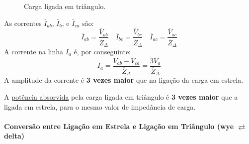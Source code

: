 \begin{centering}
\begin{minipage}[b]{0.4\linewidth}
\begin{figure}[H]
{\begin{circuitikz}[>=stealth]
        
        \end{circuitikz}
        }%
        \caption{Carga ligada em triângulo.}
        \end{figure}
\end{minipage}%
    \begin{minipage}[b]{0.6\linewidth}
        \begin{mdframed}
            \noindent As correntes $\bar{I}_{ab}$, $\bar{I}_{bc}$ e $\bar{I}_{ca}$ são:
            \vspace{0.5em}
            $$
                \bar{I}_{ab} = \dfrac{\overline{V}_{ab}}{\overline{Z}_\Delta}\quad
                \bar{I}_{bc} = \dfrac{\overline{V}_{bc}}{\overline{Z}_\Delta}\quad
                \bar{I}_{ac} = \dfrac{\overline{V}_{ac}}{\overline{Z}_\Delta}
            $$
            \vspace{0.5em}
            \noindent A corrente na linha $I_a$ é, por conseguinte:
            $$
                \boxed{\bar{I}_a = \dfrac{\overline{V}_{ab} - \overline{V}_{ca}}{\overline{Z}_\Delta} = \dfrac{3\overline{V}_a}{\overline{Z}_\Delta}}
            $$
            \noindent A amplitude da corrente é \textbf{3 vezes maior} que na ligação da carga em estrela.
        \end{mdframed}
    \end{minipage}
\end{centering}

\noindent A \underline{potência absorvida} pela carga ligada em triângulo é \textbf{3 vezes maior} que a ligada em estrela, para o mesmo valor de impedância de carga.

\paragraph{Conversão entre Ligação em Estrela e Ligação em Triângulo (wye $\rightleftarrows$ delta)}

